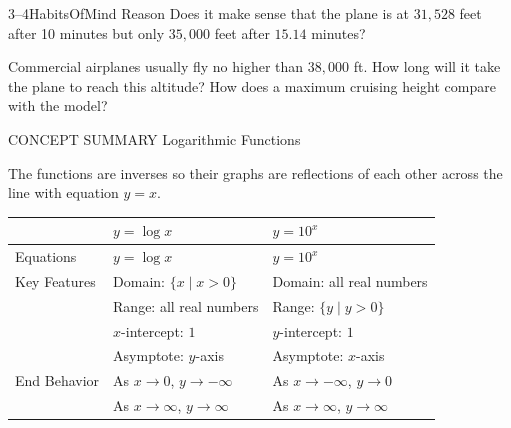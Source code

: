 \documentclass{article}
\newenvironment{concept-summary}{}{}    %
\newenvironment{tryit}[1]{}{}           %
\newenvironment{te-addendum}[2]{}{}     %
\newcommand{\answer}[1]{}               %
\begin{document}
\begin{te-addendum}{3--4}{HabitsOfMind}
Reason Does it make sense that the plane is at $31{,}528$ feet after 10 minutes but only $35{,}000$ feet after $15.14$ minutes?
\answer{Yes, because the rate of increase of a logarithmic function decreases as $t$ increases.}
\end{te-addendum}

\begin{tryit}{4}
Commercial airplanes usually fly no higher than $38{,}000$ ft. How long will it take the plane to reach this altitude? How does a maximum cruising height compare with the model?

\answer{About 21 minutes; The model is not accurate past 21 minutes since the logarithmic function continues to increase above the cruising altitude.}
\end{tryit}

\begin{concept-summary}
CONCEPT SUMMARY Logarithmic Functions

\begin{center}
\end{center}

The functions are inverses so their graphs are reflections of each other across the line with equation $y=x$.

\begin{center}
\begin{tabular}{lll}
\toprule
 & $y=\log x$ & $y=10^x$ \\
\midrule
Equations & $y=\log x$ & $y=10^x$ \\
Key Features & Domain: $\{x\mid x>0\}$ & Domain: all real numbers \\
 & Range: all real numbers & Range: $\{y\mid y>0\}$ \\
 & $x$-intercept: $1$ & $y$-intercept: $1$ \\
 & Asymptote: $y$-axis & Asymptote: $x$-axis \\
End Behavior & As $x\to0$, $y\to-\infty$ & As $x\to-\infty$, $y\to0$ \\
 & As $x\to\infty$, $y\to\infty$ & As $x\to\infty$, $y\to\infty$ \\
\bottomrule
\end{tabular}
\end{center}
\end{concept-summary}
\end{document}
